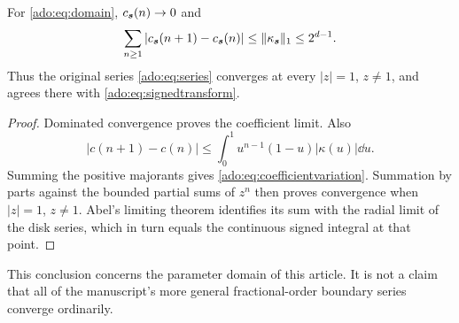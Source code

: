 \begin{corollary}
\label{ado:cor:boundaryseries}
For \eqref{ado:eq:domain}, $c_{\boldsymbol{s}}(n)\to0$ and
\begin{equation}\label{ado:eq:coefficientvariation}
 \sum_{n\ge1}|c_{\boldsymbol{s}}(n+1)-c_{\boldsymbol{s}}(n)|
 \le\lVert\kappa_{\boldsymbol{s}}\rVert_1\le2^{d-1}.
\end{equation}
Thus the original series \eqref{ado:eq:series} converges at every
$|z|=1$, $z\ne1$, and agrees there with \eqref{ado:eq:signedtransform}.
\end{corollary}
\begin{proof}
Dominated convergence proves the coefficient limit. Also
\[
 |c(n+1)-c(n)|\le\int_0^1u^{n-1}(1-u)|\kappa(u)|\dd u.
\]
Summing the positive majorants gives \eqref{ado:eq:coefficientvariation}.
Summation by parts against the bounded partial sums of $z^n$ then proves
convergence when $|z|=1$, $z\ne1$. Abel's limiting theorem identifies its
sum with the radial limit of the disk series, which in turn equals the
continuous signed integral at that point.
\end{proof}
This conclusion concerns the parameter domain of this article. It is not
a claim that all of the manuscript's more general fractional-order
boundary series converge ordinarily.
